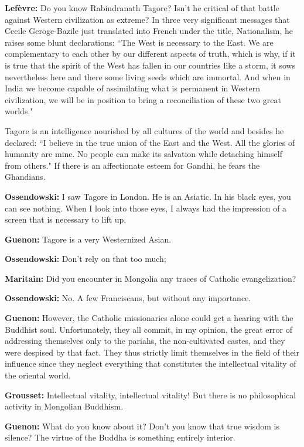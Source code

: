 \textbf{Lefèvre:} Do you know Rabindranath Tagore? Isn't he critical of that battle against Western civilization as extreme? In three very significant messages that Cecile Geroge-Bazile just translated into French under the title, Nationalism, he raises some blunt declarations: ``The West is necessary to the East. We are complementary to each other by our different aspects of truth, which is why, if it is true that the spirit of the West has fallen in our countries like a storm, it sows nevertheless here and there some living seeds which are immortal. And when in India we become capable of assimilating what is permanent in Western civilization, we will be in position to bring a reconciliation of these two great worlds."

Tagore is an intelligence nourished by all cultures of the world and besides he declared: ``I believe in the true union of the East and the West. All the glories of humanity are mine. No people can make its salvation while detaching himself from others." If there is an affectionate esteem for Gandhi, he fears the Ghandians.

\textbf{Ossendowski:} I saw Tagore in London. He is an Asiatic. In his black eyes, you can see nothing. When I look into those eyes, I always had the impression of a screen that is necessary to lift up.

\textbf{Guenon:} Tagore is a very Westernized Asian.

\textbf{Ossendowski:} Don't rely on that too much;

\textbf{Maritain:} Did you encounter in Mongolia any traces of Catholic evangelization?

\textbf{Ossendowski:} No. A few Franciscans, but without any importance.

\textbf{Guenon:} However, the Catholic missionaries alone could get a hearing with the Buddhist soul. Unfortunately, they all commit, in my opinion, the great error of addressing themselves only to the pariahs, the non-cultivated castes, and they were despised by that fact. They thus strictly limit themselves in the field of their influence since they neglect everything that constitutes the intellectual vitality of the oriental world.

\textbf{Grousset:} Intellectual vitality, intellectual vitality! But there is no philosophical activity in Mongolian Buddhism.

\textbf{Guenon:} What do you know about it? Don't you know that true wisdom is silence? The virtue of the Buddha is something entirely interior.

